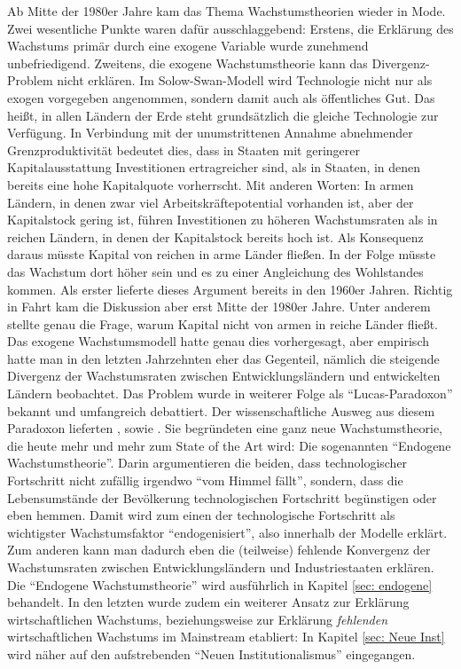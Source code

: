 Ab Mitte der 1980er Jahre kam das Thema Wachstumstheorien wieder in Mode. Zwei wesentliche Punkte waren dafür ausschlaggebend: Erstens, die Erklärung des Wachstums primär durch eine exogene Variable wurde zunehmend unbefriedigend. Zweitens, die exogene Wachstumstheorie kann das Divergenz-Problem nicht erklären. Im Solow-Swan-Modell wird Technologie nicht nur als exogen vorgegeben angenommen, sondern damit auch als öffentliches Gut. Das heißt, in allen Ländern der Erde steht grundsätzlich die gleiche Technologie zur Verfügung. In Verbindung mit der unumstrittenen Annahme abnehmender Grenzproduktivität bedeutet dies, dass in Staaten mit geringerer Kapitalausstattung Investitionen ertragreicher sind, als in Staaten, in denen bereits eine hohe Kapitalquote vorherrscht. Mit anderen Worten: In armen Ländern, in denen zwar viel Arbeitskräftepotential vorhanden ist, aber der Kapitalstock gering ist, führen Investitionen zu höheren Wachstumsraten als in reichen Ländern, in denen der Kapitalstock bereits hoch ist. Als Konsequenz daraus müsste Kapital von reichen in arme Länder fließen. In der Folge müsste das Wachstum dort höher sein und es zu einer Angleichung des Wohlstandes kommen. Als erster lieferte \textcite{Gerschenkron1962} dieses Argument bereits in den 1960er Jahren. Richtig in Fahrt kam die Diskussion aber erst Mitte der 1980er Jahre. Unter anderem stellte \textcite{Lucas1990} genau die Frage, warum Kapital nicht von armen in reiche Länder fließt. Das exogene Wachstumsmodell hatte genau dies vorhergesagt, aber empirisch hatte man in den letzten Jahrzehnten eher das Gegenteil, nämlich die steigende Divergenz der Wachstumsraten zwischen Entwicklungsländern und entwickelten Ländern beobachtet. Das Problem wurde in weiterer Folge als "`Lucas-Paradoxon"' bekannt und umfangreich debattiert. Der wissenschaftliche Ausweg aus diesem Paradoxon lieferten \textcite{Romer1986, Romer1990}, sowie \textcite{Lucas1988}. Sie begründeten eine ganz neue Wachstumstheorie, die heute mehr und mehr zum State of the Art wird: Die sogenannten "`Endogene Wachstumstheorie"'. Darin argumentieren die beiden, dass technologischer Fortschritt nicht zufällig irgendwo "`vom Himmel fällt"', sondern, dass die Lebensumstände der Bevölkerung technologischen Fortschritt begünstigen oder eben hemmen. Damit wird zum einen der technologische Fortschritt als wichtigster Wachstumsfaktor "`endogenisiert"', also innerhalb der Modelle erklärt. Zum anderen kann man dadurch eben die (teilweise) fehlende Konvergenz der Wachstumsraten zwischen Entwicklungsländern und Industriestaaten erklären. Die "`Endogene Wachstumstheorie"' wird ausführlich in Kapitel \ref{sec: endogene} behandelt. In den letzten wurde zudem ein weiterer Ansatz zur Erklärung wirtschaftlichen Wachstums, beziehungsweise zur Erklärung \textit{fehlenden} wirtschaftlichen Wachstums im Mainstream etabliert: In Kapitel \ref{sec: Neue Inst} wird näher auf den aufstrebenden "`Neuen Institutionalismus"' eingegangen. 

